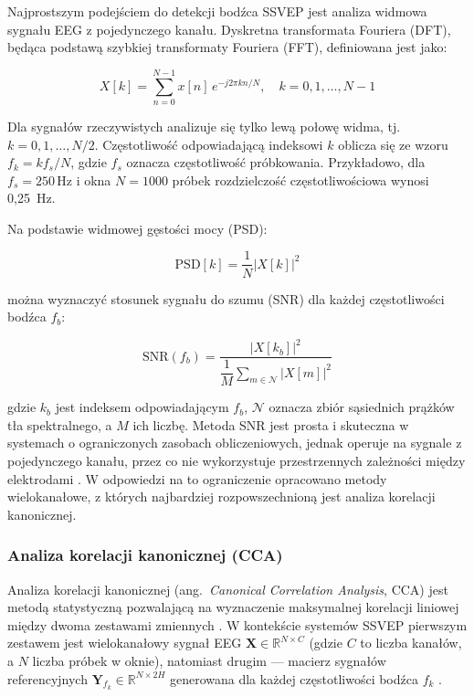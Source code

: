 Najprostszym podejściem do detekcji bodźca SSVEP jest analiza widmowa
sygnału EEG z pojedynczego kanału. Dyskretna transformata Fouriera (DFT),
będąca podstawą szybkiej transformaty Fouriera (FFT), definiowana jest jako:

\begin{equation}
    X[k] = \sum_{n=0}^{N-1} x[n] \, e^{-j 2 \pi k n / N},
    \quad k = 0, 1, \dots, N-1
\end{equation}

\noindent Dla sygnałów rzeczywistych analizuje się tylko lewą połowę widma,
tj.\ $k = 0, 1, \dots, N/2$. Częstotliwość odpowiadającą indeksowi $k$
oblicza się ze wzoru $f_k = k f_s / N$, gdzie $f_s$ oznacza częstotliwość
próbkowania. Przykładowo, dla $f_s = 250\,\mathrm{Hz}$ i okna $N = 1000$
próbek rozdzielczość częstotliwościowa wynosi 0{,}25~Hz.

Na podstawie widmowej gęstości mocy (PSD):

\begin{equation}
    \mathrm{PSD}[k] = \frac{1}{N} |X[k]|^2
\end{equation}

\noindent można wyznaczyć stosunek sygnału do szumu (SNR) dla każdej
częstotliwości bodźca $f_b$:

\begin{equation}
    \mathrm{SNR}(f_b) =
    \frac{|X[k_b]|^2}{\dfrac{1}{M} \displaystyle\sum_{m \in \mathcal{N}}
    |X[m]|^2}
\end{equation}

\noindent gdzie $k_b$ jest indeksem odpowiadającym $f_b$, $\mathcal{N}$
oznacza zbiór sąsiednich prążków tła spektralnego, a $M$ ich liczbę.
Metoda SNR jest prosta i skuteczna w systemach o ograniczonych zasobach
obliczeniowych, jednak operuje na sygnale z pojedynczego kanału, przez co
nie wykorzystuje przestrzennych zależności między elektrodami \cite{bin2009}.
W odpowiedzi na to ograniczenie opracowano metody wielokanałowe, z których
najbardziej rozpowszechnioną jest analiza korelacji kanonicznej.

\subsubsection{Analiza korelacji kanonicznej (CCA)}

Analiza korelacji kanonicznej (ang.\ \textit{Canonical Correlation Analysis},
CCA) jest metodą statystyczną pozwalającą na wyznaczenie maksymalnej
korelacji liniowej między dwoma zestawami zmiennych \cite{lin2006}.
W kontekście systemów SSVEP pierwszym zestawem jest wielokanałowy sygnał
EEG $\mathbf{X} \in \mathbb{R}^{N \times C}$ (gdzie $C$ to liczba kanałów,
a $N$ liczba próbek w oknie), natomiast drugim --- macierz sygnałów
referencyjnych $\mathbf{Y}_{f_k} \in \mathbb{R}^{N \times 2H}$ generowana
dla każdej częstotliwości bodźca $f_k$ \cite{bin2009, nakanishi2018}.

